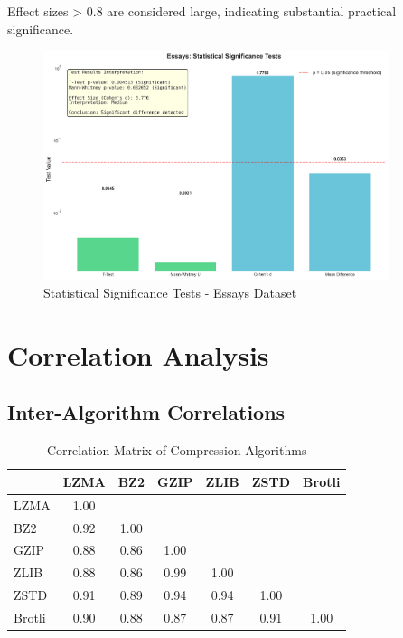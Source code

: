 \documentclass[12pt,a4paper]{report}
\begin{document}
Effect sizes > 0.8 are considered large, indicating substantial practical significance.

\begin{figure}[h]
\centering
\includegraphics[width=0.9\textwidth]{figures/essays_visualizations/04_statistical_significance.png}
\caption{Statistical Significance Tests - Essays Dataset}
\label{fig:significance_essays}
\end{figure}

\section{Correlation Analysis}

\subsection{Inter-Algorithm Correlations}

\begin{table}[h]
\centering
\caption{Correlation Matrix of Compression Algorithms}
\begin{tabular}{lcccccc}
\toprule
 & LZMA & BZ2 & GZIP & ZLIB & ZSTD & Brotli \\
\midrule
LZMA & 1.00 & & & & & \\
BZ2 & 0.92 & 1.00 & & & & \\
GZIP & 0.88 & 0.86 & 1.00 & & & \\
ZLIB & 0.88 & 0.86 & 0.99 & 1.00 & & \\
ZSTD & 0.91 & 0.89 & 0.94 & 0.94 & 1.00 & \\
Brotli & 0.90 & 0.88 & 0.87 & 0.87 & 0.91 & 1.00 \\
\bottomrule
\end{tabular}
\end{table}
\end{document}
